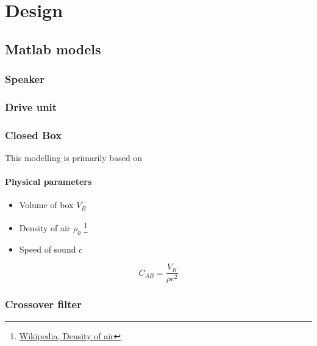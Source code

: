 
\chapter{Design}
\label{ch:Design}


\section{Matlab models}
\subsection{Speaker}

\subsection{Drive unit}

\subsection{Closed Box}
This modelling is primarily based on 

\subsubsection{Physical parameters}
\begin{itemize}
	\item Volume of box $V_B$
	\item Density of air $\rho_0$ \footnote{\href{https://en.wikipedia.org/wiki/Density_of_air}{Wikipedia, Density of air}}
	\item Speed of sound $c$
\end{itemize}

\begin{equation}
	C_{AB} = \frac{V_B}{\rho c^2}
\end{equation}

\subsection{Crossover filter}

\FloatBarrier